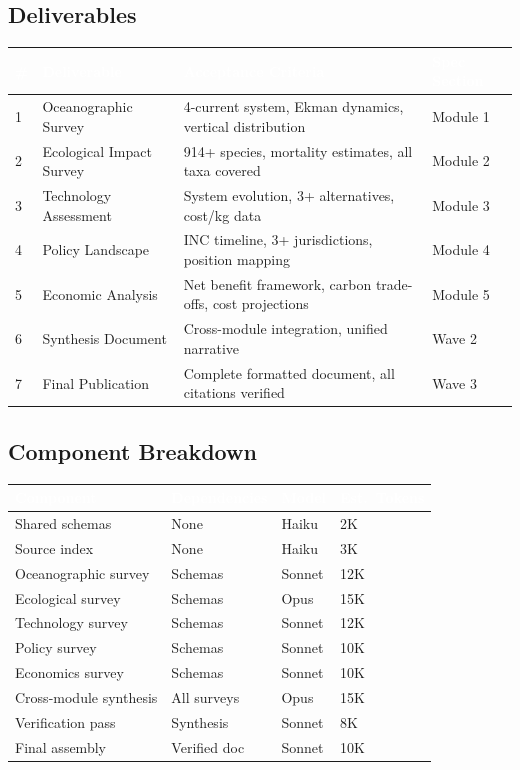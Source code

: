 \documentclass[11pt,letterpaper]{article}
\newcommand{\tableheader}[1]{\textbf{\sffamily\textcolor{white}{#1}}}
\begin{document}
\subsection{Deliverables}

\begin{center}
\begin{tabularx}{\textwidth}{C{0.6cm}L{3.5cm}XL{2.5cm}}
\toprule
{}
\tableheader{\#} & \tableheader{Deliverable} & \tableheader{Acceptance Criteria} & \tableheader{Spec Section} \\
 & Oceanographic Survey & 4-current system, Ekman dynamics, vertical distribution & Module 1 \\
2 & Ecological Impact Survey & 914+ species, mortality estimates, all taxa covered & Module 2 \\
3 & Technology Assessment & System evolution, 3+ alternatives, cost/kg data & Module 3 \\
4 & Policy Landscape & INC timeline, 3+ jurisdictions, position mapping & Module 4 \\
5 & Economic Analysis & Net benefit framework, carbon trade-offs, cost projections & Module 5 \\
6 & Synthesis Document & Cross-module integration, unified narrative & Wave 2 \\
7 & Final Publication & Complete formatted document, all citations verified & Wave 3 \\
\bottomrule
\end{tabularx}
\end{center}

\subsection{Component Breakdown}

\begin{center}
\begin{tabularx}{\textwidth}{L{3.5cm}L{2cm}C{1.5cm}C{2cm}}
\toprule
{}
\tableheader{Component} & \tableheader{Dependencies} & \tableheader{Model} & \tableheader{Est.\ Tokens} \\
\midrule
Shared schemas & None & Haiku & 2K \\
Source index & None & Haiku & 3K \\
Oceanographic survey & Schemas & Sonnet & 12K \\
Ecological survey & Schemas & Opus & 15K \\
Technology survey & Schemas & Sonnet & 12K \\
Policy survey & Schemas & Sonnet & 10K \\
Economics survey & Schemas & Sonnet & 10K \\
Cross-module synthesis & All surveys & Opus & 15K \\
Verification pass & Synthesis & Sonnet & 8K \\
Final assembly & Verified doc & Sonnet & 10K \\
\bottomrule
\end{tabularx}
\end{center}
\end{document}
